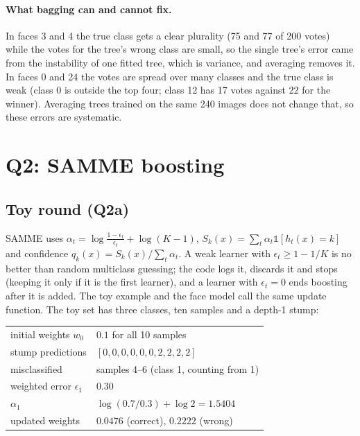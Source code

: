 \documentclass[10pt,twocolumn,letterpaper]{article}
\begin{document}
\paragraph{What bagging can and cannot fix.}
In faces 3 and 4 the true class gets a clear plurality (75 and 77 of 200 votes) while the votes for the tree's wrong class are small,
so the single tree's error came from the instability of one fitted tree, which is variance, and averaging removes it.
In faces 0 and 24 the votes are spread over many classes and the true class is weak (class 0 is outside the top four; class 12 has 17 votes
against 22 for the winner). Averaging trees trained on the same 240 images does not change that, so these errors are systematic.

\section{Q2: SAMME boosting}

\subsection{Toy round (Q2a)}
SAMME uses $\alpha_t=\log\frac{1-\epsilon_t}{\epsilon_t}+\log(K-1)$, $S_k(x)=\sum_t\alpha_t\mathbb{1}[h_t(x)=k]$ and
confidence $q_k(x)=S_k(x)/\sum_t\alpha_t$.
A weak learner with $\epsilon_t\ge1-1/K$ is no better than random multiclass guessing; the code logs it, discards it and stops
(keeping it only if it is the first learner), and a learner with $\epsilon_t=0$ ends boosting after it is added.
The toy example and the face model call the same update function. The toy set has three classes, ten samples and a depth-1 stump:

\begin{center}
\small
\begin{tabular}{ll}
initial weights $w_0$ & $0.1$ for all 10 samples\\
stump predictions & $[0,0,0,0,0,0,2,2,2,2]$\\
misclassified & samples 4--6 (class 1, counting from 1)\\
weighted error $\epsilon_1$ & $0.30$\\
$\alpha_1$ & $\log(0.7/0.3)+\log2=1.5404$\\
updated weights & $0.0476$ (correct), $0.2222$ (wrong)\\
\end{tabular}
\end{center}
\end{document}
